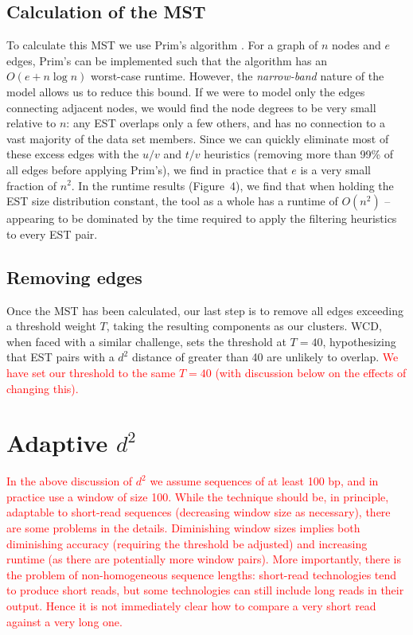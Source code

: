 \documentclass[a4paper,12pt]{article}
\newcommand{\mc}[1]{\textcolor{red}{#1}}
\newcommand{\wcd} {{\small WCD}}
\begin{document}
\begin{appendix}
\subsection{Calculation of the MST}

To calculate this MST we use Prim's algorithm \cite{Prim57}.  For a
graph of $n$ nodes and $e$ edges, Prim's can be implemented such that
the algorithm has an $O(e + n \log n)$ worst-case runtime.  However,
the {\it narrow-band} nature of the model allows us to reduce this
bound.  If we were to model only the edges connecting adjacent nodes,
we would find the node degrees to be very small relative to $n$: any
EST overlaps only a few others, and has no connection to a vast
majority of the data set members.  Since we can quickly eliminate most
of these excess edges with the $u/v$ and $t/v$ heuristics (removing
more than 99\% of all edges before applying Prim's), we find in
practice that $e$ is a very small fraction of $n^2$.  In the
runtime results (Figure~4), we find that when holding the EST size
distribution constant, the tool as a whole has a runtime of $O(n^2)$
-- appearing to be dominated by the time required to apply
the filtering heuristics to every EST pair.

\subsection{Removing edges}

Once the MST has been calculated, our last step is to remove all
edges exceeding a threshold weight $T$, taking the resulting
components as our clusters.  \wcd, when faced with a similar
challenge, sets the threshold at $T=40$, hypothesizing that EST pairs
with a $d^2$ distance of greater than 40 are unlikely to overlap.  \mc{We
have set our threshold to the same $T=40$ (with discussion below on
the effects of changing this).}

\section{Adaptive $d^2$}

\mc{In the above discussion of $d^2$ we assume sequences of at least 100
bp, and in practice use a window of size 100.  While the technique
should be, in principle, adaptable to short-read sequences (decreasing
window size as necessary), there are some problems in the details.
Diminishing window sizes implies both diminishing accuracy (requiring
the threshold be adjusted) and increasing runtime (as there are
potentially more window pairs).  More importantly, there is the
problem of non-homogeneous sequence lengths: short-read technologies
tend to produce short reads, but some technologies can still include
long reads in their output.  Hence it is not immediately clear how to
compare a very short read against a very long one.}


\end{appendix}
\end{document}
